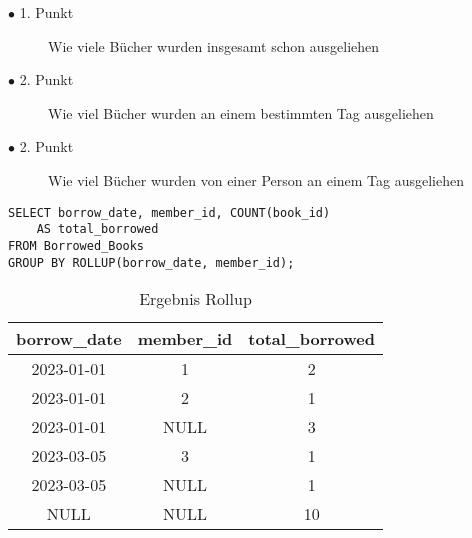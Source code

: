 \begin{description}
	\label{bul:aufzählung}

	\item[$\bullet$ 1. Punkt] Wie viele Bücher wurden insgesamt schon ausgeliehen

	\item[$\bullet$ 2. Punkt] Wie viel Bücher wurden an einem bestimmten Tag ausgeliehen

	\item[$\bullet$ 2. Punkt] Wie viel Bücher wurden von einer Person an einem Tag
		ausgeliehen
\end{description}

\filbreak

\begin{lstlisting}[caption={Beispiel eines ROLLUP}, label={list:rollup}]
SELECT borrow_date, member_id, COUNT(book_id)
	AS total_borrowed
FROM Borrowed_Books
GROUP BY ROLLUP(borrow_date, member_id);
\end{lstlisting}

\begin{table}[h]
	\centering
	\begin{tabular}{|c|c|c|}
		\hline
		\textbf{borrow\_date} & \textbf{member\_id} & \textbf{total\_borrowed} \\
		\hline
		2023-01-01            & 1                   & 2                        \\ %
		\hline
		2023-01-01            & 2                   & 1                        \\ %
		\hline
		2023-01-01            & NULL                & 3                        \\ %
		\hline
		2023-03-05            & 3                   & 1                        \\
		\hline
		2023-03-05            & NULL                & 1                        \\
		\hline
		NULL                  & NULL                & 10                       \\
		\hline
	\end{tabular}
	\caption{Ergebnis Rollup}
	\label{tab:rollup}
\end{table}


